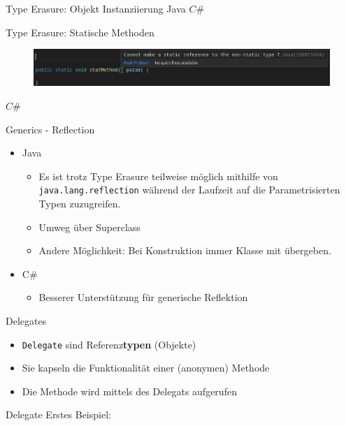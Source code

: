 \documentclass[11pt]{beamer}
\begin{document}
\begin{frame}{Type Erasure: Objekt Instanziierung}
	Java
	$C\#$
\end{frame}

\begin{frame}{Type Erasure: Statische Methoden}
	\begin{figure}
		\includegraphics[width=\textwidth]{bilder/java_no_static_methods.png}
	\end{figure}
	
	$C\#$
\end{frame}

\begin{frame}{Generics - Reflection}
\begin{itemize}
	\item Java 
	\begin{itemize}
		\item Es ist trotz Type Erasure teilweise möglich mithilfe von \texttt{java.lang.reflection} während der Laufzeit auf die Parametrisierten Typen zuzugreifen. 
		\item \glqq Umweg\grqq{} über Superclass
		\item Andere Möglichkeit: Bei Konstruktion immer Klasse mit übergeben.
	\end{itemize}
	\item C\# 
	\begin{itemize}
		\item Besserer Unterstützung für generische Reflektion
	\end{itemize}
\end{itemize}
\end{frame}


\begin{frame}{Delegates}
\begin{itemize}
 	\item \texttt{Delegate} sind Referenz\textbf{typen} (Objekte)
 	\item Sie kapseln die Funktionalität einer (anonymen) Methode
 	\item Die Methode wird mittels des Delegats aufgerufen
\end{itemize}
	
\end{frame}
\begin{frame}{Delegate}
	Erstes Beispiel:
\end{frame}
\end{document}
